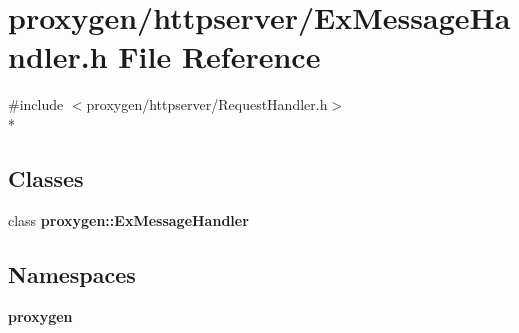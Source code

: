 \section{proxygen/httpserver/\+Ex\+Message\+Handler.h File Reference}
\label{ExMessageHandler_8h}
{\ttfamily \#include $<$proxygen/httpserver/\+Request\+Handler.\+h$>$}\\*
\subsection*{Classes}
\begin{DoxyCompactItemize}
\item 
class {\bf proxygen\+::\+Ex\+Message\+Handler}
\end{DoxyCompactItemize}
\subsection*{Namespaces}
\begin{DoxyCompactItemize}
\item 
 {\bf proxygen}
\end{DoxyCompactItemize}
